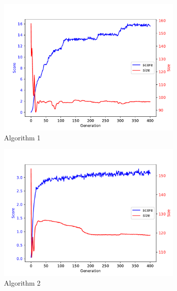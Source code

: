 \documentclass[12pt,a4paper]{article}
\begin{document}
		
		\begin{figure}[h!]
			\begin{subfigure}{.33\textwidth}
			\centering
			\includegraphics[width=\linewidth]{../code/plots/alg1_score_vs_size}
			\caption{Algorithm 1}
			\label{fig:alg1_score_vs_size}
			\end{subfigure}
			\begin{subfigure}{.33\textwidth}
			\centering
			\includegraphics[width=\linewidth]{../code/plots/alg2_score_vs_size}
			\caption{Algorithm 2}
			\label{fig:alg2_score_vs_size}
			\end{subfigure}
			\begin{subfigure}{.33\textwidth}
			\centering

\end{subfigure}
\end{figure}
\end{document}

